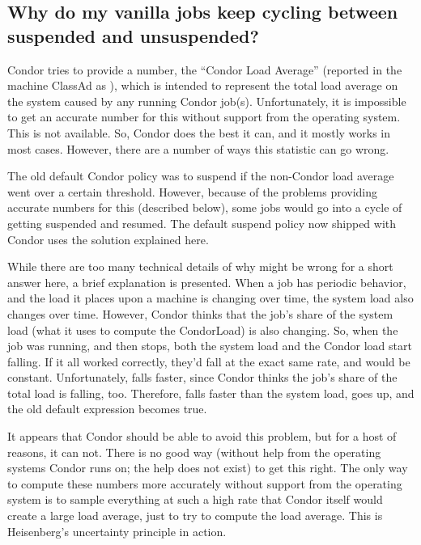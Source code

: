 \subsection*{Why do my vanilla jobs keep cycling between suspended and unsuspended?}

Condor tries to provide a number, the ``Condor Load Average''
(reported in the machine ClassAd as ), which is
intended to represent the total load average on the system caused by
any running Condor job(s).
Unfortunately, it is impossible to get an accurate number for
this without support from the operating system.
This is not available.
So, Condor does the best it can, and it mostly works in most cases.
However, there are a number of ways this statistic can go wrong.

The old default Condor policy was to suspend if the non-Condor load
average went over a certain threshold.
However, because of the problems providing accurate numbers for this
(described below), some jobs would go into a cycle of getting
suspended and resumed.
The default suspend policy now shipped with Condor uses the
solution explained here.

While there are too many technical details of why
 might be wrong for a short answer here, a brief
explanation is presented.
When a job has periodic behavior, and the load it places upon
a machine is changing over time,
the system load also changes over time.  
However, Condor thinks that the job's share of the system load
(what it uses to compute the CondorLoad) is also changing.
So, when the job was running, and then stops, both the system load and
the Condor load start falling.
If it all worked correctly, they'd fall at the exact same rate, and
 would be constant.
Unfortunately,  falls faster, since Condor
thinks the job's share of the total load is falling, too.
Therefore,  falls faster than the system load,
 goes up, and the old default 
expression becomes true.

It appears that Condor should be able to avoid this problem, but for a
host of reasons, it can not.  
There is no good way (without help from the operating systems Condor runs on;
the help does not exist) to get this right.
The only way to compute these numbers more accurately
without support from the operating system is to sample everything at
such a high rate that Condor itself would create a large load average,
just to try to compute the load average.
This is Heisenberg's uncertainty principle in action.

